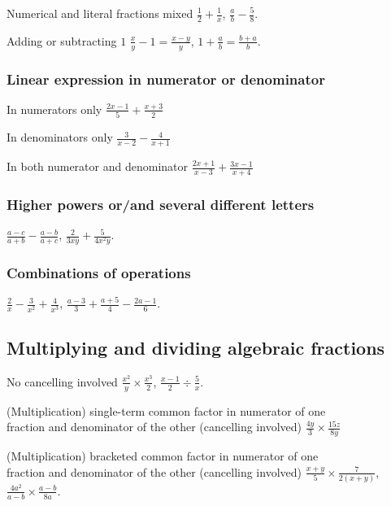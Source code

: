 \documentclass{article}
\begin{document}
Numerical and literal fractions mixed \hfill \(\frac{1}{2}+\frac{1}{x}\), \(\frac{a}{b} - \frac{5}{8}\).

Adding or subtracting \(1\) \hfill \(\frac{x}{y} - 1 = \frac{x-y}{y}\), \(1+\frac{a}{b} = \frac{b+a}{b}\).

\subsubsection{Linear expression in numerator or denominator}

In numerators only \hfill \(\frac{2x-1}{5}+\frac{x+3}{2}\)

In denominators only \hfill \(\frac{3}{x-2} - \frac{4}{x+1}\)

In both numerator and denominator \hfill \(\frac{2x+1}{x-3} + \frac{3x-1}{x+4}\)

\subsubsection{Higher powers or/and several different letters}

\begin{flushright}
\(\frac{a-c}{a+b} - \frac{a-b}{a+c}\), \(\frac{2}{3xy} + \frac{5}{4x^2y}\).
\end{flushright}

\subsubsection{Combinations of operations}

\begin{flushright}
\(\frac{2}{x} - \frac{3}{x^2} + \frac{4}{x^3}\), \(\frac{a-3}{3} + \frac{a+5}{4} - \frac{2a-1}{6}\).
\end{flushright}

\subsection{Multiplying and dividing algebraic fractions}

No cancelling involved \hfill \(\frac{x^2}{y} \times \frac{x^3}{2}\), \(\frac{x-1}{2} \div \frac{5}{x}\).

(Multiplication) single-term common factor in numerator of one\\
fraction and denominator of the other (cancelling involved) \hfill \(\frac{4y}{3} \times \frac{15z}{8y}\)

(Multiplication) bracketed common factor in numerator of one \\
fraction and denominator of the other (cancelling involved) \hfill \(\frac{x+y}{5} \times \frac{7}{2(x+y)}\), \(\frac{4a^2}{a-b} \times \frac{a-b}{8a}\).
\end{document}
